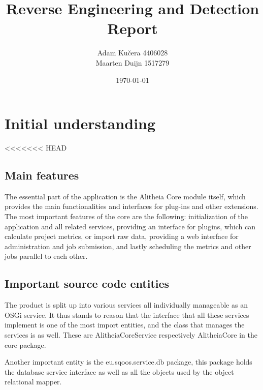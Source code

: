 \documentclass[a4paper,11pt,titlepage]{article}
\author{Adam Ku\v{c}era 4406028\\Maarten Duijn 1517279}
\title{Reverse Engineering and Detection Report}
\date{\today}
\begin{document}
\maketitle

\section{Initial understanding}
<<<<<<< HEAD
\subsection{Main features}
The essential part of the application is the Alitheia Core module itself, which provides the main functionalities and interfaces for plug-ins and other extensions. The most important features of the core are the following: initialization of the application and all related services, providing an interface for plugins, which can calculate project metrics, or import raw data, providing a web interface for administration and job submission, and lastly scheduling the metrics and other jobs parallel to each other.

%

\subsection{Important source code entities}
The product is split up into various services all individually manageable as an OSGi service. It thus stands to reason that the interface that all these services implement is one of the most import entities, and the class that manages the services is as well. These are AlitheiaCoreService respectively AlitheiaCore in the core package.

Another important entity is the eu.sqoos.service.db package, this package holds the database service interface as well as all the objects used by the object relational mapper.
\end{document}
